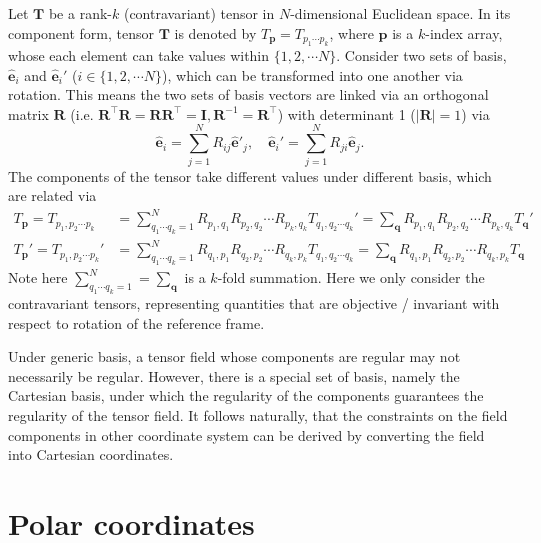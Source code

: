 \documentclass[a4paper, 11pt]{article}
\begin{document}
Let $\mathbf{T}$ be a rank-$k$ (contravariant) tensor in $N$-dimensional Euclidean space. In its component form, tensor $\mathbf{T}$ is denoted by $T_\mathbf{p} = T_{p_1\cdots p_k}$, where $\mathbf{p}$ is a $k$-index array, whose each element can take values within $\{1, 2, \cdots N\}$. Consider two sets of basis, $\hat{\mathbf{e}}_i$ and $\hat{\mathbf{e}}_i'$ ($i\in\{1,2,\cdots N\}$), which can be transformed into one another via rotation. This means the two sets of basis vectors are linked via an orthogonal matrix $\mathbf{R}$ (i.e. $\mathbf{R}^\top \mathbf{R} = \mathbf{R}\mathbf{R}^\top = \mathbf{I}, \mathbf{R}^{-1} = \mathbf{R}^\top$) with determinant 1 ($|\mathbf{R}| = 1$) via
\begin{equation}
    \hat{\mathbf{e}}_i = \sum_{j=1}^N R_{ij} \hat{\mathbf{e}}'_j,\quad 
    \hat{\mathbf{e}}_i' = \sum_{j=1}^N R_{ji} \hat{\mathbf{e}}_j.
\end{equation}
The components of the tensor take different values under different basis, which are related via 
\begin{equation}
    \begin{aligned}
        T_\mathbf{p} = T_{p_1,p_2\cdots p_k} &= \sum_{q_1\cdots q_k=1}^N R_{p_1,q_1} R_{p_2,q_2}\cdots R_{p_k,q_k} T_{q_1,q_2\cdots q_k}' = \sum_{\mathbf{q}} R_{p_1,q_1} R_{p_2,q_2}\cdots R_{p_k,q_k} T_{\mathbf{q}}' \\
        T_\mathbf{p}' = T_{p_1,p_2\cdots p_k}' &= \sum_{q_1\cdots q_k=1}^N R_{q_1,p_1} R_{q_2,p_2}\cdots R_{q_k, p_k} T_{q_1,q_2\cdots q_k} = \sum_{\mathbf{q}} R_{q_1,p_1} R_{q_2,p_2}\cdots R_{q_k, p_k} T_{\mathbf{q}}
    \end{aligned}
\end{equation}
Note here $\sum_{q_1\cdots q_k=1}^N = \sum_\mathbf{q}$ is a $k$-fold summation. Here we only consider the contravariant tensors, representing quantities that are objective / invariant with respect to rotation of the reference frame. 

Under generic basis, a tensor field whose components are regular may not necessarily be regular. However, there is a special set of basis, namely the Cartesian basis, under which the regularity of the components guarantees the regularity of the tensor field. It follows naturally, that the constraints on the field components in other coordinate system can be derived by converting the field into Cartesian coordinates.


\section{Polar coordinates}
\end{document}
